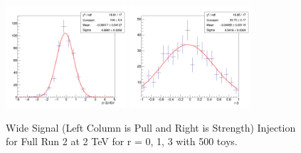 \begin{figure}[!htb]
	\includegraphics[width=0.4\textwidth]{Figures/signalInjection3_500_sigpull_2000wide.png}
	\includegraphics[width=0.4\textwidth]{Figures/signalInjection3_500_sigstrength_2000wide.png}
	\caption{Wide Signal (Left Column is Pull and Right is Strength) Injection for Full Run 2 at 2 TeV for r = 0, 1, 3 with 500 toys.}
	\label{fig:signalInjection2000plotwide}
\end{figure}

